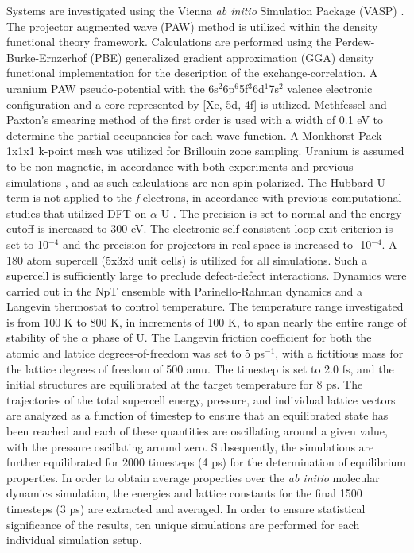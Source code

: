 \documentclass[utf8]{frontiersSCNS} %
\begin{document}
Systems are investigated using the Vienna \textit{ab initio} Simulation Package (VASP) \cite{vasp1, vasp2, vasp3, vasp4}. The projector augmented wave (PAW) method \cite{paw1, paw2} is utilized within the density functional theory \cite{dft1, dft2} framework. Calculations are performed using the Perdew-Burke-Ernzerhof (PBE) \cite{pbe1, pbe2} generalized gradient approximation (GGA) density functional implementation for the description of the exchange-correlation. A uranium PAW pseudo-potential with the 6s$^{2}$6p$^{6}$5f$^{3}$6d$^{1}$7s$^{2}$ valence electronic configuration and a core represented by [Xe, 5d, 4f] is utilized. Methfessel and Paxton's smearing method \cite{methfessel} of the first order is used with a width of 0.1 eV to determine the partial occupancies for each wave-function. A Monkhorst-Pack \cite{monkhorst} 1x1x1 k-point mesh was utilized for Brillouin zone sampling. Uranium is assumed to be non-magnetic, in accordance with both experiments \cite{chembook} and previous simulations \cite{beeler2013}, and as such calculations are non-spin-polarized. The Hubbard U term is not applied to the \textit{f} electrons, in accordance with previous computational studies that utilized DFT on $\alpha$-U \cite{wirth2011, wirth2012, taylor2008, beeler2013}. The precision is set to normal and the energy cutoff is increased to 300 eV. The electronic self-consistent loop exit criterion is set to 10$^{-4}$ and the precision for projectors in real space is increased to -10$^{-4}$. A 180 atom supercell (5x3x3 unit cells) is utilized for all simulations. Such a supercell is sufficiently large to preclude defect-defect interactions. Dynamics were carried out in the NpT ensemble with Parinello-Rahman dynamics and a Langevin thermostat to control temperature. The temperature range investigated is from 100 K to 800 K, in increments of 100 K, to span nearly the entire range of stability of the $\alpha$ phase of U. The Langevin friction coefficient for both the atomic and lattice degrees-of-freedom was set to 5 ps$^{-1}$, with a fictitious mass for the lattice degrees of freedom of 500 amu. The timestep is set to 2.0 fs, and the initial structures are equilibrated at the target temperature for 8 ps. The trajectories of the total supercell energy, pressure, and individual lattice vectors are analyzed as a function of timestep to ensure that an equilibrated state has been reached and each of these quantities are oscillating around a given value, with the pressure oscillating around zero. Subsequently, the simulations are further equilibrated for 2000 timesteps (4 ps) for the determination of equilibrium properties. In order to obtain average properties over the \textit{ab initio} molecular dynamics simulation, the energies and lattice constants for the final 1500 timesteps (3 ps) are extracted and averaged. In order to ensure statistical significance of the results, ten unique simulations are performed for each individual simulation setup. 
\end{document}
